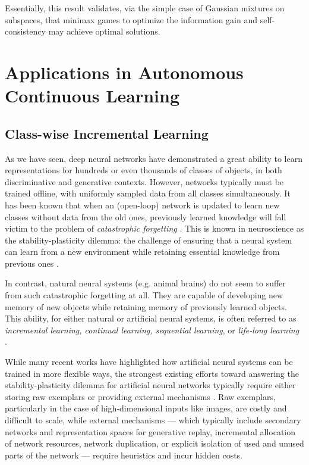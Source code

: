\documentclass[../../book-main.tex]{subfiles}
\begin{document}
Essentially, this result validates, via the simple case of Gaussian mixtures on subspaces, that minimax games to optimize the information gain and self-consistency may achieve optimal solutions.






\section{Applications in Autonomous Continuous Learning}

\subsection{Class-wise Incremental Learning}
\label{sec:class-wise-incremental}

As we have seen, deep neural networks have demonstrated a great ability to learn representations for hundreds or even thousands of classes of objects, in both discriminative and generative contexts. However, networks typically must be trained offline, with uniformly sampled data from all classes simultaneously. It has been known that when an (open-loop) network is updated to learn new classes without data from the old ones, previously learned knowledge will fall victim to the problem of {\em catastrophic forgetting} \cite{McCloskey1989catastrophic}. This is known in neuroscience as the stability-plasticity dilemma: the challenge of ensuring that a neural system can learn from a new environment while retaining essential knowledge from previous ones \cite{Grossberg1987CompetitiveLF}.

In contrast, natural neural systems (e.g. animal brains) do not seem to suffer from such catastrophic forgetting at all. They are capable of developing new memory of new objects while retaining memory of previously learned objects. This ability, for either natural or artificial neural systems, is often referred to as {\em  incremental learning, continual learning, sequential learning}, or {\em life-long learning}~ \cite{controlled-forgetting}.



While many recent works have highlighted how artificial neural systems can be  trained in more flexible ways, the strongest existing efforts toward answering the stability-plasticity dilemma for artificial neural networks typically require either storing raw exemplars \cite{icarl,chaudhry2019tiny} or providing external mechanisms \cite{EWC}. Raw exemplars, particularly in the case of high-dimensional inputs like images, are costly and difficult to scale, while external mechanisms --- which typically include secondary networks and representation spaces for generative replay, incremental allocation of network resources, network duplication, or explicit isolation of used and unused parts of the network --- require heuristics and incur hidden costs.
\end{document}
